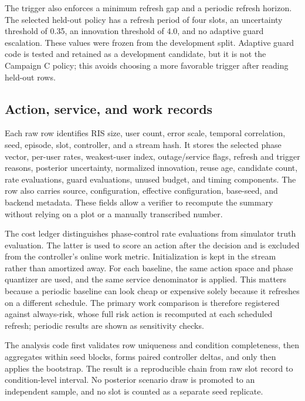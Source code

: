 \documentclass[10pt,twocolumn]{article}
\begin{document}
The trigger also enforces a minimum refresh gap and a periodic refresh
horizon. The selected held-out policy has a refresh period of four
slots, an uncertainty threshold of 0.35, an innovation threshold of 4.0,
and no adaptive guard escalation. These values were frozen from the
development split. Adaptive guard code is tested and retained as a
development candidate, but it is not the Campaign C policy; this avoids
choosing a more favorable trigger after reading held-out rows.

\subsection{Action, service, and work
records}\label{action-service-and-work-records}

Each raw row identifies RIS size, user count, error scale, temporal
correlation, seed, episode, slot, controller, and a stream hash. It
stores the selected phase vector, per-user rates, weakest-user index,
outage/service flags, refresh and trigger reasons, posterior
uncertainty, normalized innovation, reuse age, candidate count, rate
evaluations, guard evaluations, unused budget, and timing components.
The row also carries source, configuration, effective configuration,
base-seed, and backend metadata. These fields allow a verifier to
recompute the summary without relying on a plot or a manually
transcribed number.

The cost ledger distinguishes phase-control rate evaluations from
simulator truth evaluation. The latter is used to score an action after
the decision and is excluded from the controller's online work metric.
Initialization is kept in the stream rather than amortized away. For
each baseline, the same action space and phase quantizer are used, and
the same service denominator is applied. This matters because a periodic
baseline can look cheap or expensive solely because it refreshes on a
different schedule. The primary work comparison is therefore registered
against always-risk, whose full risk action is recomputed at each
scheduled refresh; periodic results are shown as sensitivity checks.

The analysis code first validates row uniqueness and condition
completeness, then aggregates within seed blocks, forms paired
controller deltas, and only then applies the bootstrap. The result is a
reproducible chain from raw slot record to condition-level interval. No
posterior scenario draw is promoted to an independent sample, and no
slot is counted as a separate seed replicate.
\end{document}
